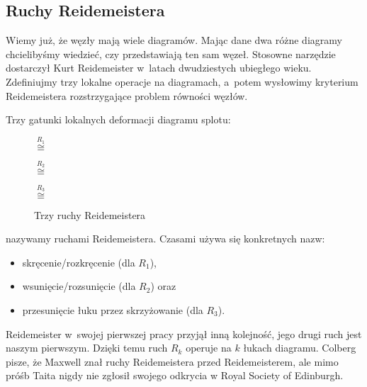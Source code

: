 
\subsection{Ruchy Reidemeistera}

Wiemy już, że węzły mają wiele diagramów.
Mając dane dwa różne diagramy chcielibyśmy wiedzieć, czy przedstawiają ten sam węzeł.
Stosowne narzędzie dostarczył Kurt Reidemeister w~latach dwudziestych ubiegłego wieku.
%
Zdefiniujmy trzy lokalne operacje na diagramach, a~potem wysłowimy kryterium  Reidemeistera rozstrzygające problem równości węzłów.

\begin{definition}
%
    Trzy gatunki lokalnych deformacji diagramu splotu:
    \begin{figure}[H]
    \centering
    \begin{minipage}[b]{.22\linewidth}%
        \centering%
        \MedLarReidemeisterOneLeft $\stackrel{R_1}{\cong}$ \MedLarReidemeisterOneStraight%
    \end{minipage}
    \quad\quad\quad
    \begin{minipage}[b]{.2\linewidth}
        \centering
        \MedLarReidemeisterTwoA $\stackrel{R_2}{\cong}$ \MedLarReidemeisterTwoB
    \end{minipage}
    \quad\quad\quad
    \begin{minipage}[b]{.32\linewidth}
        \centering
        \MedLarReidemeisterThreeA $\stackrel{R_3}{\cong}$ \MedLarReidemeisterThreeB
    \end{minipage}
    \caption[reidemeister-moves]{Trzy ruchy Reidemeistera}
    \end{figure}
    nazywamy ruchami Reidemeistera.
    Czasami używa się konkretnych nazw:
    \begin{itemize}
        \item skręcenie/rozkręcenie (dla $R_1$),
        \item wsunięcie/rozsunięcie (dla $R_2$) oraz
        \item przesunięcie łuku przez skrzyżowanie (dla $R_3$).
    \end{itemize}
\end{definition}

Reidemeister w~swojej pierwszej pracy przyjął inną kolejność, jego drugi ruch jest naszym pierwszym.
Dzięki temu ruch $R_k$ operuje na $k$ łukach diagramu.
Colberg \cite[s. 6]{colberg2013} pisze, że Maxwell znał ruchy Reidemeistera przed Reidemeisterem, ale mimo próśb Taita nigdy nie zgłosił swojego odkrycia w Royal Society of Edinburgh.
%
%

